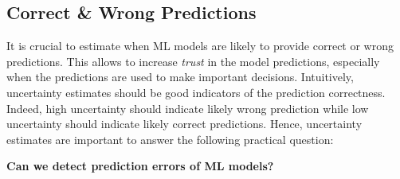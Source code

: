 \begin{table*}[ht]
    \begin{center}
    \end{center}
    \caption{Overview of evaluation methods for uncertainty estimation}
    \label{tab:overview_evaluation}
\end{table*}

\subsection{Correct \& Wrong Predictions}

It is crucial to estimate when ML models are likely to provide correct or wrong predictions. This allows to increase \emph{trust} in the model predictions, especially when the predictions are used to make important decisions. Intuitively, uncertainty estimates should be good indicators of the prediction correctness. Indeed, high uncertainty should indicate likely wrong prediction while low uncertainty should indicate likely correct predictions. Hence, uncertainty estimates are important to answer the following practical question:

\begin{center}
    \textbf{Can we detect prediction errors of ML models?}
\end{center}

